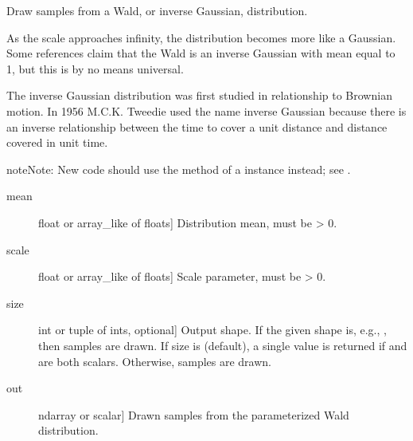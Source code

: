 \documentclass[letterpaper,10pt,english]{sphinxmanual}
\begin{document}
\begin{fulllineitems}
\label{\detokenize{infrapy.utils:infrapy.utils.ref2sac.wald}}
Draw samples from a Wald, or inverse Gaussian, distribution.

As the scale approaches infinity, the distribution becomes more like a
Gaussian. Some references claim that the Wald is an inverse Gaussian
with mean equal to 1, but this is by no means universal.

The inverse Gaussian distribution was first studied in relationship to
Brownian motion. In 1956 M.C.K. Tweedie used the name inverse Gaussian
because there is an inverse relationship between the time to cover a
unit distance and distance covered in unit time.

\begin{sphinxadmonition}{note}{Note:}
New code should use the  method of a 
instance instead; see .
\end{sphinxadmonition}
\begin{description}
\item[{mean}] \leavevmode{[}float or array\_like of floats{]}
Distribution mean, must be \textgreater{} 0.

\item[{scale}] \leavevmode{[}float or array\_like of floats{]}
Scale parameter, must be \textgreater{} 0.

\item[{size}] \leavevmode{[}int or tuple of ints, optional{]}
Output shape.  If the given shape is, e.g., , then
 samples are drawn.  If size is  (default),
a single value is returned if  and  are both scalars.
Otherwise,  samples are drawn.

\end{description}
\begin{description}
\item[{out}] \leavevmode{[}ndarray or scalar{]}
Drawn samples from the parameterized Wald distribution.

\end{description}


\end{fulllineitems}
\end{document}
